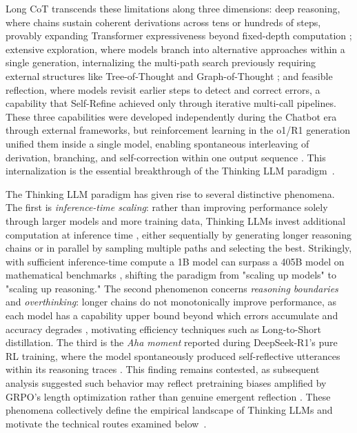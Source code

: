 Long CoT transcends these limitations along three dimensions: deep reasoning, where chains sustain coherent derivations across tens or hundreds of steps, provably expanding Transformer expressiveness beyond fixed-depth computation \cite{feng2023towards}; extensive exploration, where models branch into alternative approaches within a single generation, internalizing the multi-path search previously requiring external structures like Tree-of-Thought \cite{yao2023tree} and Graph-of-Thought \cite{besta2024graph}; and feasible reflection, where models revisit earlier steps to detect and correct errors, a capability that Self-Refine \cite{madaan2023selfrefine} achieved only through iterative multi-call pipelines. These three capabilities were developed independently during the Chatbot era through external frameworks, but reinforcement learning in the o1/R1 generation unified them inside a single model, enabling spontaneous interleaving of derivation, branching, and self-correction within one output sequence \cite{deepseek2025r1,yeo2025demystifying}. This internalization is the essential breakthrough of the Thinking LLM paradigm~\citep{zheng2025fast,ge2025innate,guo2025deepseek,cai2025unilaw,zhang2025100}.

The Thinking LLM paradigm has given rise to several distinctive phenomena. The first is \textit{inference-time scaling}: rather than improving performance solely through larger models and more training data, Thinking LLMs invest additional computation at inference time \cite{snell2024scaling}, either sequentially by generating longer reasoning chains or in parallel by sampling multiple paths and selecting the best. Strikingly, with sufficient inference-time compute a 1B model can surpass a 405B model on mathematical benchmarks \cite{liu2025can}, shifting the paradigm from "scaling up models" to "scaling up reasoning." The second phenomenon concerns \textit{reasoning boundaries} and \textit{overthinking}: longer chains do not monotonically improve performance, as each model has a capability upper bound beyond which errors accumulate and accuracy degrades \cite{chen2024unlocking,chen2025donot}, motivating efficiency techniques such as Long-to-Short distillation. The third is the \textit{Aha moment} reported during DeepSeek-R1's pure RL training, where the model spontaneously produced self-reflective utterances within its reasoning traces \cite{deepseek2025r1}. This finding remains contested, as subsequent analysis suggested such behavior may reflect pretraining biases amplified by GRPO's length optimization rather than genuine emergent reflection \cite{liu2025understanding}. These phenomena collectively define the empirical landscape of Thinking LLMs and motivate the technical routes examined below~\citep{parmar2025challenges,dang2025reinforcement,liu2025logical,chen2026learning,so2025large}.

